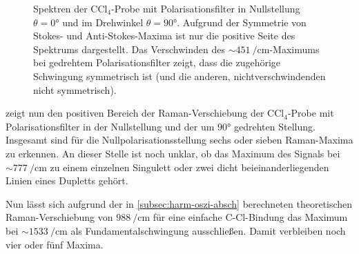 \documentclass[../bericht.tex]{subfiles}
\begin{document}
        \begin{figure}[tb]
          \caption[Spektren der $\mathrm{CCl_4}$-Probe mit Polarisationsfilter in Nullstellung $\theta=\ang{0}$ und im Drehwinkel $\theta=\ang{90}$.]{Spektren der $\mathrm{CCl_4}$-Probe mit Polarisationsfilter in Nullstellung $\theta=\ang{0}$ und im Drehwinkel $\theta=\ang{90}$. Aufgrund der Symmetrie von Stokes- und Anti-Stokes-Maxima ist nur die positive Seite des Spektrums dargestellt. Das Verschwinden des $\sim\SI{451}{\per\centi\meter}$-Maximums bei gedrehtem Polarisationsfilter zeigt, dass die zugehörige Schwingung symmetrisch ist (und die anderen, nichtverschwindenden nicht symmetrisch).}
          \label{fig:ccl4-beide-pol}
        \end{figure}

         zeigt nun den positiven Bereich der Raman-Verschiebung der $\mathrm{CCl_4}$-Probe mit Polarisationsfilter in der Nullstellung und der um $\ang{90}$ gedrehten Stellung. Insgesamt sind für die Nullpolarisationsstellung sechs oder sieben Raman-Maxima zu erkennen. An dieser Stelle ist noch unklar, ob das Maximum des Signals bei $\sim \SI{777}{\per\centi\meter}$ zu einem einzelnen Singulett oder zwei dicht beieinanderliegenden Linien eines Dupletts gehört.

        Nun lässt sich aufgrund der in \cref{subsec:harm-oszi-absch} berechneten theoretischen Raman-Verschiebung von $\SI{988}{\per\centi\meter}$ für eine einfache C-Cl-Bindung das Maximum bei $\sim \SI{1533}{\per\centi\meter}$ als Fundamentalschwingung ausschließen. Damit verbleiben noch vier oder fünf Maxima.
\end{document}
